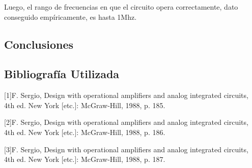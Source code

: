 \documentclass[a4paper]{article}
\begin{document}
Luego, el rango de frecuencias en que el circuito opera correctamente, dato conseguido empíricamente, es hasta 1Mhz.


\subsection{Conclusiones}

\subsection{Bibliografía Utilizada}
[1]F. Sergio, Design with operational amplifiers and analog integrated circuits, 4th ed. New York [etc.]: McGraw-Hill, 1988, p. 185.

[2]F. Sergio, Design with operational amplifiers and analog integrated circuits, 4th ed. New York [etc.]: McGraw-Hill, 1988, p. 186.

[3]F. Sergio, Design with operational amplifiers and analog integrated circuits, 4th ed. New York [etc.]: McGraw-Hill, 1988, p. 187.
\end{document}
